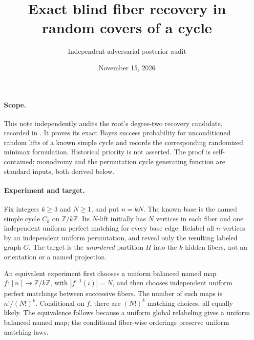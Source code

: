\documentclass[11pt]{article}
\title{Exact blind fiber recovery in random covers of a cycle}
\author{Independent adversarial posterior audit}
\date{November 15, 2026}
\begin{document}
\maketitle

\paragraph{Scope.}
This note independently audits the root's degree-two recovery candidate,
recorded in .
It proves its exact Bayes success probability for unconditioned random
lifts of a known simple cycle and records the corresponding randomized
minimax formulation. Historical priority is not asserted. The proof is
self-contained; monodromy and the permutation cycle generating function
are standard inputs, both derived below.

\paragraph{Experiment and target.}
Fix integers $k\geq3$ and $N\geq1$, and put $n=kN$.
The known base is the named simple cycle $C_k$ on $\mathbb Z/k\mathbb Z$.
Its $N$-lift initially has $N$ vertices in each fiber and one independent
uniform perfect matching for every base edge. Relabel all $n$ vertices
by an independent uniform permutation, and reveal only the resulting
labeled graph $G$. The target is the \emph{unordered} partition $\Pi$
into the $k$ hidden fibers, not an orientation or a named projection.

An equivalent experiment first chooses a uniform balanced named map
$f:[n]\to\mathbb Z/k\mathbb Z$, with $|f^{-1}(i)|=N$, and then
chooses independent uniform perfect matchings between successive fibers.
The number of such maps is $n!/(N!)^k$. Conditional on $f$, there are
$(N!)^k$ matching choices, all equally likely. The equivalence follows
because a uniform global relabeling gives a uniform balanced named map;
the conditional fiber-wise orderings preserve uniform matching laws.
\end{document}

